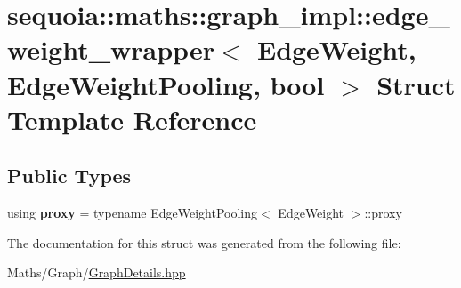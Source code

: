 \hypertarget{structsequoia_1_1maths_1_1graph__impl_1_1edge__weight__wrapper}{}\section{sequoia\+::maths\+::graph\+\_\+impl\+::edge\+\_\+weight\+\_\+wrapper$<$ Edge\+Weight, Edge\+Weight\+Pooling, bool $>$ Struct Template Reference}
\label{structsequoia_1_1maths_1_1graph__impl_1_1edge__weight__wrapper}
\subsection*{Public Types}
\begin{DoxyCompactItemize}
\item 
\mbox{\label{structsequoia_1_1maths_1_1graph__impl_1_1edge__weight__wrapper_a71574e772df2dd9b6678beb7a1b10f4e}} 
using {\bfseries proxy} = typename Edge\+Weight\+Pooling$<$ Edge\+Weight $>$\+::proxy
\end{DoxyCompactItemize}


The documentation for this struct was generated from the following file\+:\begin{DoxyCompactItemize}
\item 
Maths/\+Graph/\mbox{\hyperlink{_graph_details_8hpp}{Graph\+Details.\+hpp}}\end{DoxyCompactItemize}
